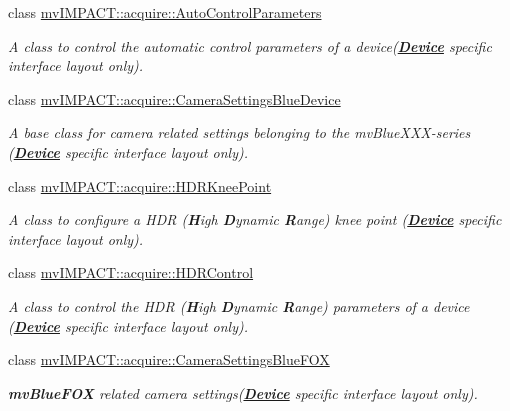 \begin{DoxyCompactItemize}
class \hyperlink{classmv_i_m_p_a_c_t_1_1acquire_1_1_auto_control_parameters}{mv\+I\+M\+P\+A\+C\+T\+::acquire\+::\+Auto\+Control\+Parameters}
\begin{DoxyCompactList}\small\item\em A class to control the automatic control parameters of a device({\bfseries \hyperlink{classmv_i_m_p_a_c_t_1_1acquire_1_1_device}{Device}} specific interface layout only). \end{DoxyCompactList}\item 
class \hyperlink{classmv_i_m_p_a_c_t_1_1acquire_1_1_camera_settings_blue_device}{mv\+I\+M\+P\+A\+C\+T\+::acquire\+::\+Camera\+Settings\+Blue\+Device}
\begin{DoxyCompactList}\small\item\em A base class for camera related settings belonging to the mv\+Blue\+X\+X\+X-\/series ({\bfseries \hyperlink{classmv_i_m_p_a_c_t_1_1acquire_1_1_device}{Device}} specific interface layout only). \end{DoxyCompactList}\item 
class \hyperlink{classmv_i_m_p_a_c_t_1_1acquire_1_1_h_d_r_knee_point}{mv\+I\+M\+P\+A\+C\+T\+::acquire\+::\+H\+D\+R\+Knee\+Point}
\begin{DoxyCompactList}\small\item\em A class to configure a H\+D\+R ({\bfseries H}igh {\bfseries D}ynamic {\bfseries R}ange) knee point ({\bfseries \hyperlink{classmv_i_m_p_a_c_t_1_1acquire_1_1_device}{Device}} specific interface layout only). \end{DoxyCompactList}\item 
class \hyperlink{classmv_i_m_p_a_c_t_1_1acquire_1_1_h_d_r_control}{mv\+I\+M\+P\+A\+C\+T\+::acquire\+::\+H\+D\+R\+Control}
\begin{DoxyCompactList}\small\item\em A class to control the H\+D\+R ({\bfseries H}igh {\bfseries D}ynamic {\bfseries R}ange) parameters of a device ({\bfseries \hyperlink{classmv_i_m_p_a_c_t_1_1acquire_1_1_device}{Device}} specific interface layout only). \end{DoxyCompactList}\item 
class \hyperlink{classmv_i_m_p_a_c_t_1_1acquire_1_1_camera_settings_blue_f_o_x}{mv\+I\+M\+P\+A\+C\+T\+::acquire\+::\+Camera\+Settings\+Blue\+F\+O\+X}
\begin{DoxyCompactList}\small\item\em {\bfseries mv\+Blue\+F\+O\+X} related camera settings({\bfseries \hyperlink{classmv_i_m_p_a_c_t_1_1acquire_1_1_device}{Device}} specific interface layout only). \end{DoxyCompactList}\item 

\end{DoxyCompactItemize}
